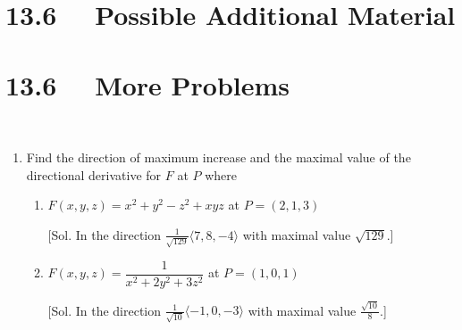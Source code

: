 \section*{13.6 \ \  Possible Additional Material}


\section*{13.6 \ \ More Problems}

\ 


\begin{enumerate}
\item  Find the direction of maximum increase and the maximal value of the directional derivative for $F$ at $P$ where
\begin{enumerate}
\item  $F(x, y, z) = x^2 + y^2 - z^2 + xyz$ at $P = (2, 1, 3)$ 

[Sol. In the direction $\frac{1}{\sqrt{129}} \langle 7, 8, -4 \rangle$ with maximal value $\sqrt{129}$.]  \\

\item  $F(x, y, z) = \dfrac{1}{x^2 + 2y^2 + 3z^2}$ at $P = (1, 0, 1)$

[Sol. In the direction $\frac{1}{\sqrt{10}} \langle -1, 0, -3 \rangle$ with maximal value $\frac{\sqrt{10}}{8}$.] \\

\end{enumerate}

\end{enumerate}